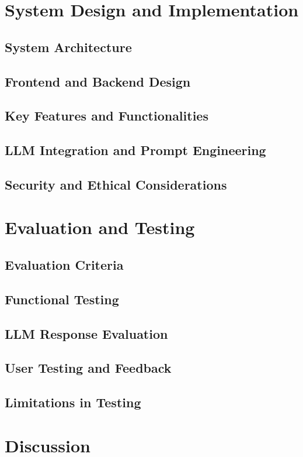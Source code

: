 \documentclass{report}
\begin{document}
\chapter{System Design and Implementation}  %
\section{System Architecture}
\section{Frontend and Backend Design}
\section{Key Features and Functionalities}
\section{LLM Integration and Prompt Engineering}
\section{Security and Ethical Considerations}

\chapter{Evaluation and Testing}  %
\section{Evaluation Criteria}
\section{Functional Testing}
\section{LLM Response Evaluation}
\section{User Testing and Feedback}
\section{Limitations in Testing}

\chapter{Discussion}  %
\end{document}

